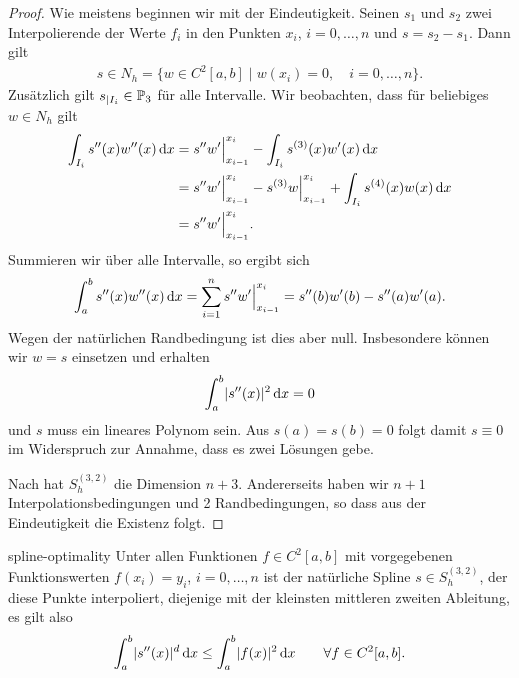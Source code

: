 \begin{proof}
  Wie meistens beginnen wir mit der Eindeutigkeit. Seinen $s_1$ und
  $s_2$ zwei Interpolierende der Werte $f_i$ in den Punkten $x_i$,
  $i=0,\dots,n$ und $s=s_2-s_1$. Dann gilt
  \begin{gather}
    \label{eq:splines:n}
    s \in N_h = \bigl\{ w\in C^2[a,b]
    \;\big|\; w(x_i) = 0, \quad i=0,\dots,n \bigr\}.
  \end{gather}
  Zusätzlich gilt $s_{| I_i}\in \P_3$ für alle Intervalle. Wir beobachten, dass für beliebiges $w\in N_h$ gilt
  \begin{align}
    \int_{I_i} s''(x) w''(x)\dx
    &= s''w'\Bigr|^{x_i}_{x_{i-1}} - \int_{I_i} s^{(3)}(x) w'(x)\dx\\
    &= s''w'\Bigr|^{x_i}_{x_{i-1}} - s^{(3)}w \Bigr|^{x_i}_{x_{i-1}}
      + \int_{I_i} s^{(4)}(x) w(x)\dx\\
    &= s''w'\Bigr|^{x_i}_{x_{i-1}}.
  \end{align}
  Summieren wir über alle Intervalle, so ergibt sich
  \begin{gather}
    \int_a^b s''(x) w''(x)\dx = \sum_{i=1}^n s''w'\Bigr|^{x_i}_{x_{i-1}}
    = s''(b) w'(b) - s''(a)w'(a).
  \end{gather}
  Wegen der natürlichen Randbedingung ist dies aber null. Insbesondere
  können wir $w=s$ einsetzen und erhalten
  \begin{gather}
    \int_a^b \abs{s''(x)}^2 \dx = 0
  \end{gather}
  und $s$ muss ein lineares Polynom sein. Aus $s(a) = s(b) = 0$ folgt
  damit $s\equiv 0$ im Widerspruch zur Annahme, dass es zwei Lösungen
  gebe.

  Nach  hat $S_h^{(3,2)}$ die Dimension
  $n+3$. Andererseits haben wir $n+1$ Interpolationsbedingungen und 2
  Randbedingungen, so dass aus der Eindeutigkeit die Existenz folgt.
\end{proof}

\begin{Lemma}{spline-optimality}
  Unter allen Funktionen $f\in C^2[a,b]$ mit vorgegebenen
  Funktionswerten $f(x_i) = y_i$, $i=0,\dots,n$ ist der natürliche
  Spline $s\in S_h^{(3,2)}$, der diese Punkte interpoliert, diejenige
  mit der kleinsten mittleren zweiten Ableitung, es gilt also
  \begin{gather}
    \int_a^b \abs{s''(x)}^d\dx \le \int_a^b \abs{f(x)}^2 \dx
    \qquad \forall f\in C^2[a,b].
  \end{gather}
\end{Lemma}

